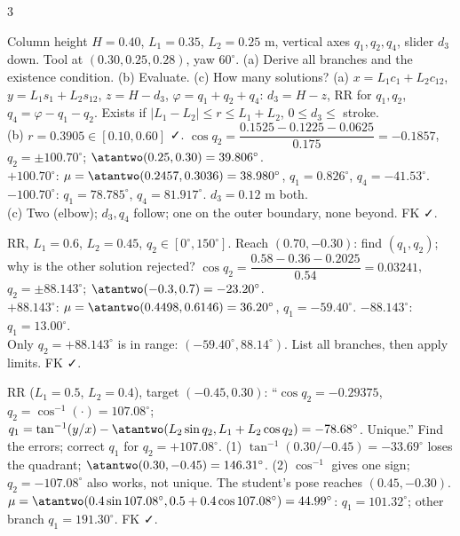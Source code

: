 \begin{multicols}{3}
\begin{examq}
Column height $H=0.40$, $L_1=0.35$, $L_2=0.25$ m, vertical axes $q_1,q_2,q_4$, slider $d_3$ down. Tool at $(0.30,0.25,0.28)$, yaw $60^\circ$. (a) Derive all branches and the existence condition. (b) Evaluate. (c) How many solutions?
\solution
(a) $x=L_1c_1+L_2c_{12}$, $y=L_1s_1+L_2s_{12}$, $z=H-d_3$, $\varphi=q_1+q_2+q_4$: $d_3=H-z$, RR for $q_1,q_2$, $q_4=\varphi-q_1-q_2$. Exists if $|L_1-L_2|\le r\le L_1+L_2$, $0\le d_3\le$ stroke.\\
(b) $r=0.3905\in[0.10,0.60]$ ✓. $\cos q_2=\dfrac{0.1525-0.1225-0.0625}{0.175}=-0.1857$, $q_2=\pm100.70^\circ$; $\atantwo(0.25,0.30)=39.806^\circ$.\\
$+100.70^\circ$: $\mu=\atantwo(0.2457,0.3036)=38.980^\circ$, $q_1=0.826^\circ$, $q_4=-41.53^\circ$.\\
$-100.70^\circ$: $q_1=78.785^\circ$, $q_4=81.917^\circ$. $d_3=\mathbf{0.12}$ m both.\\
(c) Two (elbow); $d_3,q_4$ follow; one on the outer boundary, none beyond. FK ✓. \chk
\end{examq}
\begin{examq}
RR, $L_1=0.6$, $L_2=0.45$, $q_2\in[0^\circ,150^\circ]$. Reach $(0.70,-0.30)$: find $(q_1,q_2)$; why is the other solution rejected?
\solution
$\cos q_2=\dfrac{0.58-0.36-0.2025}{0.54}=0.03241$, $q_2=\pm88.143^\circ$; $\atantwo(-0.3,0.7)=-23.20^\circ$.\\
$+88.143^\circ$: $\mu=\atantwo(0.4498,0.6146)=36.20^\circ$, $q_1=-59.40^\circ$. $-88.143^\circ$: $q_1=13.00^\circ$.\\
Only $q_2=+88.143^\circ$ is in range: \textbf{$(-59.40^\circ,88.14^\circ)$}. List all branches, then apply limits. FK ✓. \chk
\end{examq}
\begin{examq}
RR ($L_1=0.5$, $L_2=0.4$), target $(-0.45,0.30)$: ``$\cos q_2=-0.29375$, $q_2=\cos^{-1}(\cdot)=107.08^\circ$; $q_1=\tan^{-1}(y/x)-\atantwo(L_2\sin q_2,L_1+L_2\cos q_2)=-78.68^\circ$. Unique.'' Find the errors; correct $q_1$ for $q_2=+107.08^\circ$.
\solution
(1) $\tan^{-1}(0.30/{-0.45})=-33.69^\circ$ loses the quadrant; $\atantwo(0.30,-0.45)=146.31^\circ$. (2) $\cos^{-1}$ gives one sign; $q_2=-107.08^\circ$ also works, not unique. The student's pose reaches $(0.45,-0.30)$.\\
$\mu=\atantwo(0.4\sin107.08^\circ,0.5+0.4\cos107.08^\circ)=44.99^\circ$: $q_1=\mathbf{101.32^\circ}$; other branch $q_1=191.30^\circ$. FK ✓. \chk
\end{examq}
\end{multicols}
